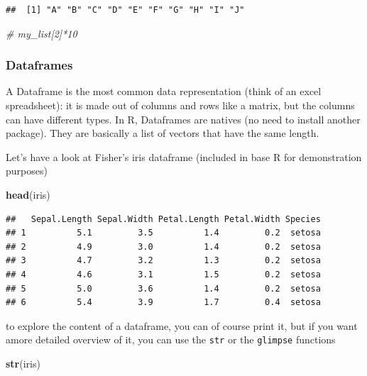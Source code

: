 \documentclass[
]{book}
\newenvironment{Shaded}{\begin{snugshade}}{\end{snugshade}}
\newcommand{\CommentTok}[1]{\textcolor[rgb]{0.56,0.35,0.01}{\textit{#1}}}
\newcommand{\KeywordTok}[1]{\textcolor[rgb]{0.13,0.29,0.53}{\textbf{#1}}}
\newcommand{\NormalTok}[1]{#1}
\begin{document}
\begin{verbatim}
##  [1] "A" "B" "C" "D" "E" "F" "G" "H" "I" "J"
\end{verbatim}

\begin{Shaded}
\begin{Highlighting}[]
\CommentTok{# my_list[2]*10}
\end{Highlighting}
\end{Shaded}

\hypertarget{dataframes}{%
\subsubsection{Dataframes}\label{dataframes}}

A Dataframe is the most common data representation (think of an excel spreadsheet): it is made out of columns and rows like a matrix, but the columns can have different types.
In R, Dataframes are natives (no need to install another package). They are basically a list of vectors that have the same length.

Let's have a look at Fisher's iris dataframe (included in base R for demonstration purposes)

\begin{Shaded}
\begin{Highlighting}[]
\KeywordTok{head}\NormalTok{(iris)}
\end{Highlighting}
\end{Shaded}

\begin{verbatim}
##   Sepal.Length Sepal.Width Petal.Length Petal.Width Species
## 1          5.1         3.5          1.4         0.2  setosa
## 2          4.9         3.0          1.4         0.2  setosa
## 3          4.7         3.2          1.3         0.2  setosa
## 4          4.6         3.1          1.5         0.2  setosa
## 5          5.0         3.6          1.4         0.2  setosa
## 6          5.4         3.9          1.7         0.4  setosa
\end{verbatim}

to explore the content of a dataframe, you can of course print it, but if you want amore detailed overview of it, you can use the \texttt{str} or the \texttt{glimpse} functions

\begin{Shaded}
\begin{Highlighting}[]
\KeywordTok{str}\NormalTok{(iris)}
\end{Highlighting}
\end{Shaded}
\end{document}
